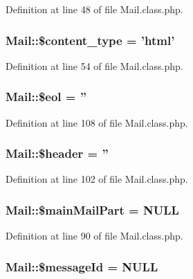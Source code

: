 Definition at line 48 of file Mail.\-class.\-php.

\hypertarget{classMail_ac933733b17efbb4978a46e557d32c440}{
\subsubsection[{\$content\-\_\-type}]{\setlength{\rightskip}{0pt plus 5cm}Mail\-::\$content\-\_\-type = 'html'}}\label{classMail_ac933733b17efbb4978a46e557d32c440}


Definition at line 54 of file Mail.\-class.\-php.

\hypertarget{classMail_acaebf19cba0b8be83989e241c96f9eb7}{
\subsubsection[{\$eol}]{\setlength{\rightskip}{0pt plus 5cm}Mail\-::\$eol = ''}}\label{classMail_acaebf19cba0b8be83989e241c96f9eb7}


Definition at line 108 of file Mail.\-class.\-php.

\hypertarget{classMail_ace98431d0944d23544743094b443d506}{
\subsubsection[{\$header}]{\setlength{\rightskip}{0pt plus 5cm}Mail\-::\$header = ''}}\label{classMail_ace98431d0944d23544743094b443d506}


Definition at line 102 of file Mail.\-class.\-php.

\hypertarget{classMail_ad58544ae1c34119ec852e3c22b855624}{
\subsubsection[{\$main\-Mail\-Part}]{\setlength{\rightskip}{0pt plus 5cm}Mail\-::\$main\-Mail\-Part = N\-U\-L\-L}}\label{classMail_ad58544ae1c34119ec852e3c22b855624}


Definition at line 90 of file Mail.\-class.\-php.

\hypertarget{classMail_a48caf58883e736f50ab87a03147c584a}{
\subsubsection[{\$message\-Id}]{\setlength{\rightskip}{0pt plus 5cm}Mail\-::\$message\-Id = N\-U\-L\-L}}\label{classMail_a48caf58883e736f50ab87a03147c584a}


